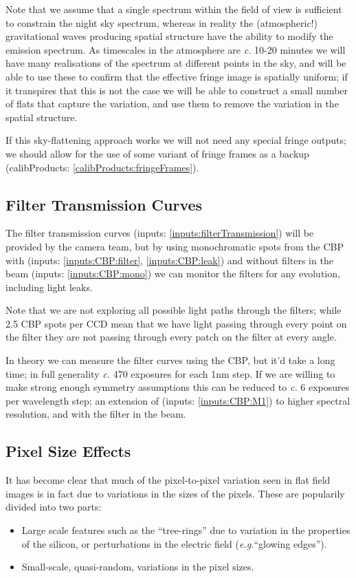 \documentclass[12pt]{article}
\renewcommand{\c}{\textit{c.}\xspace}
\newcommand{\eg}{\textit{e.g.}\xspace}
\newcommand{\inputData}[1]{(inputs: \ref{inputs:#1})}
\newcommand{\inputDataII}[2]{(inputs: \ref{inputs:#1}, \ref{inputs:#2})}
\newcommand{\outputData}[1]{(calibProducts: \ref{calibProducts:#1})}
\begin{document}
Note that we assume that a single spectrum within the field of view is sufficient to constrain the
night sky spectrum, whereas in reality the (atmospheric!) gravitational waves producing spatial structure
have the ability to modify the emission spectrum.   As timescales in the atmosphere are \c 10-20 minutes
we will have many realisations of the spectrum at different points in the sky, and will be able to use
these to confirm that the effective fringe image is spatially uniform;  if it transpires that this is
not the case we will be able to construct a small number of flats that capture the variation, and
use them to remove the variation in the spatial structure.

If this sky-flattening approach works we will not need any special fringe outputs;  we should
allow for the use of some variant of fringe frames as a backup \outputData{fringeFrames}.

\subsection{Filter Transmission Curves}
\label{sec:filterTransmission}

The filter transmission curves \inputData{filterTransmission} will be provided by the camera team, but by
using monochromatic spots from the CBP with \inputDataII{CBP:filter}{CBP:leak} and without filters in the beam
\inputData{CBP:mono} we can monitor the filters for any evolution, including light leaks.

Note that we are not exploring all possible light paths through the filters; while 2.5 CBP spots per CCD
mean that we have light passing through every point on the filter they are not passing through every
patch on the filter at every angle.

In theory we can measure the filter curves using the CBP, but it'd take a long time; in full generality \c 470
exposures for each 1nm step.  If we are willing to make strong enough symmetry assumptions this can be reduced
to \c 6 exposures per wavelength step; an extension of \inputData{CBP:M1} to higher spectral resolution, and
with the filter in the beam.

\subsection{Pixel Size Effects}
\label{sec:pixelSize}

It has become clear that much of the pixel-to-pixel variation seen in flat field images is
in fact due to variations in the sizes of the pixels.  These are popularily divided into two
parts:
\begin{itemize}
\item Large scale features such as the ``tree-rings'' due to variation in the properties of the
  silicon, or perturbations in the electric field (\eg ``glowing edges'').
\item Small-scale, quasi-random, variations in the pixel sizes.
\end{itemize}
\end{document}
